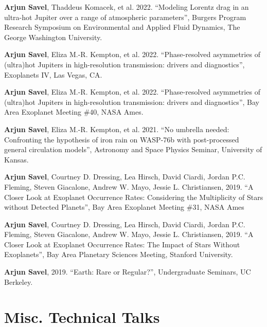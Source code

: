 \documentclass[letterpaper,10.5pt]{article}
\newcommand{\shorterSection}[1]{\vspace{-10pt}\section{#1}}
\begin{document}
\begin{list}{}{\cvlist}
\item[{\color{numcolor}\scriptsize7}] \textbf{Arjun Savel}, Thaddeus Komacek, et al. 2022. ``Modeling Lorentz drag in an ultra-hot Jupiter over a range of atmospheric parameters'', Burgers Program Research Symposium on Environmental and Applied Fluid Dynamics, The George Washington University.

     \item[{\color{numcolor}\scriptsize6}] \textbf{Arjun Savel}, Eliza M.-R. Kempton, et al. 2022. ``Phase-resolved asymmetries of (ultra)hot Jupiters in high-resolution transmission: drivers and diagnostics'', Exoplanets IV, Las Vegas, CA.


   \item[{\color{numcolor}\scriptsize5}] \textbf{Arjun Savel}, Eliza M.-R. Kempton, et al. 2022. ``Phase-resolved asymmetries of (ultra)hot Jupiters in high-resolution transmission: drivers and diagnostics'', Bay Area Exoplanet Meeting \#40, NASA Ames.


\item[{\color{numcolor}\scriptsize4}] \textbf{Arjun Savel}, Eliza M.-R. Kempton, et al. 2021. ``No umbrella needed: Confronting the hypothesis of iron rain on WASP-76b with post-processed general circulation models'', Astronomy and Space Physics Seminar, University of Kansas.



\item[{\color{numcolor}\scriptsize3}] \textbf{Arjun Savel}, Courtney D. Dressing, Lea Hirsch, David Ciardi, Jordan P.C. Fleming, Steven Giacalone, Andrew W. Mayo, Jessie L. Christiansen, 2019. “A Closer Look at Exoplanet Occurrence Rates: Considering the Multiplicity of Stars without Detected Planets”, Bay Area Exoplanet Meeting \#31, NASA Ames

\item[{\color{numcolor}\scriptsize2}] \textbf{Arjun Savel}, Courtney D. Dressing, Lea Hirsch, David Ciardi, Jordan P.C. Fleming, Steven Giacalone, Andrew W. Mayo, Jessie L. Christiansen, 2019. “A Closer Look at Exoplanet Occurrence Rates: The Impact of Stars Without Exoplanets”, Bay Area Planetary Sciences Meeting, Stanford University.

\item[{\color{numcolor}\scriptsize1}] \textbf{Arjun Savel}, 2019. “Earth: Rare or Regular?”, Undergraduate Seminars, UC Berkeley.

\end{list}

\shorterSection{Misc. Technical Talks}
\end{document}
